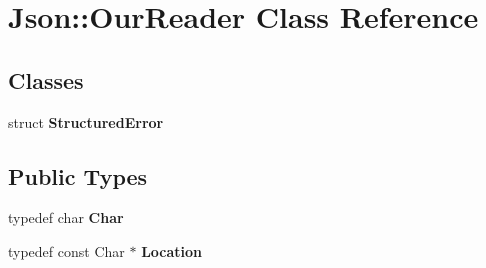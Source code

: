 \section{Json\+:\+:Our\+Reader Class Reference}
\label{class_json_1_1_our_reader}
\subsection*{Classes}
\begin{DoxyCompactItemize}
\item 
struct {\bf Structured\+Error}
\end{DoxyCompactItemize}
\subsection*{Public Types}
\begin{DoxyCompactItemize}
\item 
typedef char {\bfseries Char}\label{class_json_1_1_our_reader_a0cd0bab4caa66594ab843ccd5f9dc239}

\item 
typedef const Char $\ast$ {\bfseries Location}\label{class_json_1_1_our_reader_a1bdc7bbc52ba87cae6b19746f2ee0189}

\end{DoxyCompactItemize}
